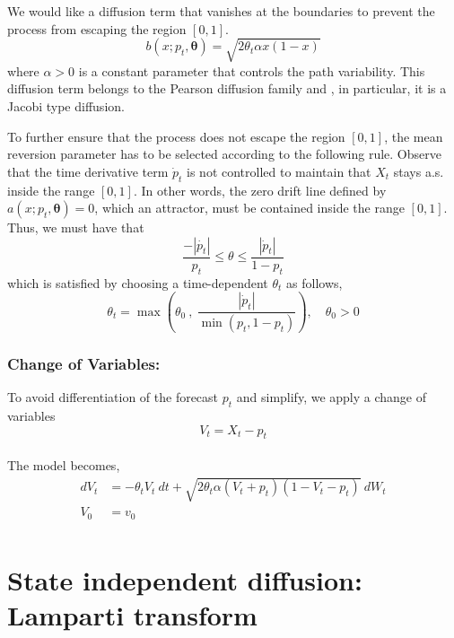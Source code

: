 \documentclass[10pt,twocolumn,letterpaper]{article}
\begin{document}
We would like  a diffusion term that vanishes at the boundaries to prevent the process from escaping the region $[0,1]$.
  \begin{equation}
    b (x; p_t,\bm{\theta} )= \sqrt{2 \theta_t \alpha x (1-x)}
  \end{equation}
  where $\alpha >0$ is a constant parameter that controls the path variability. This diffusion term belongs to the Pearson diffusion family and , in particular, it is a Jacobi type diffusion.

To further ensure that the process does not escape the region $[0,1]$, the mean reversion parameter has to be selected according to the following rule. Observe that the time derivative term $\dot{p}_t $ is not controlled to maintain that $X_t$ stays a.s.  inside the range $[0,1]$. In other words, the zero drift line defined by $a(x; p_t,\bm{\theta}) =0$, which an attractor, must be contained inside the range $[0,1]$. Thus, we must have that
\begin{equation}
\frac{- |\dot{p_t}|}{p_t} \leq \theta \leq \frac{|\dot{p}_t|}{1- p_t}
\end{equation}
which is satisfied  by choosing a time-dependent  $\theta_t$ as follows,
\begin{equation}
\theta_t = \max \left( \theta_0 \ , \ \frac{|\dot{p}_t|}{\min (p_t, 1-p_t)}  \right ),  \quad \theta_0 >0 \label{theta_t}
\end{equation}

\subsubsection*{Change of Variables:}
To avoid differentiation of the forecast $p_t$ and simplify, we apply a change of variables $$V_t = X_t - p_t$$ \\
The  model becomes,
\begin{equation}
\begin{split}
dV_t &=  - \theta_t V_t \  dt + \sqrt{2 \theta_t \alpha (V_t +p_t ) (1-V_t-p_t)} \  dW_t  \\ %
V_0 & = v_0\\
\end{split}\label{VtSDE}
\end{equation}

\section{State independent diffusion: Lamparti transform} \label{Section_3}
\end{document}
